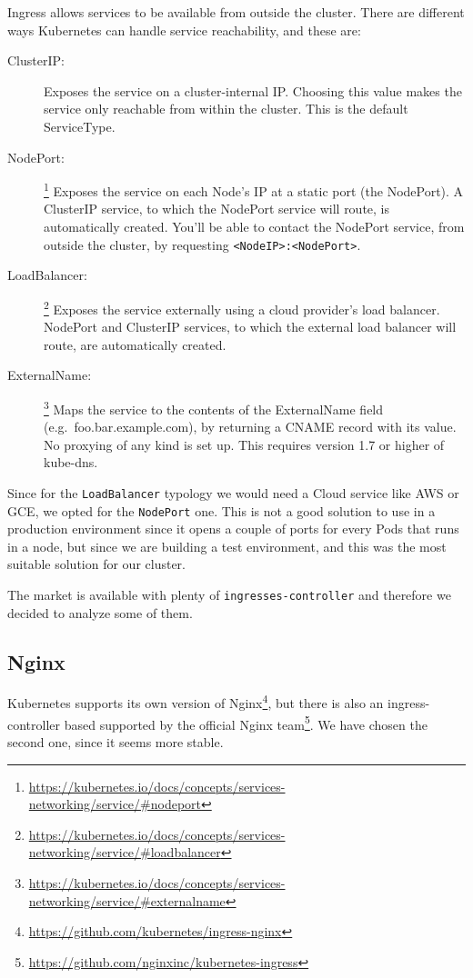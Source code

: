 Ingress allows services to be available from outside the cluster. There are 
different ways Kubernetes can handle service reachability, and these are:
\begin{description}
  \item [ClusterIP:] Exposes the service on a cluster-internal IP. Choosing this
  value makes the service only reachable from within the cluster. This
  is the default ServiceType.
  \item [NodePort:]
  \footnote{\url{https://kubernetes.io/docs/concepts/services-networking/service/\#nodeport}}
  Exposes the service on each Node's IP at a static port (the NodePort).
  A ClusterIP service, to which the NodePort service will route, is
  automatically created. You'll be able to contact the NodePort service,
  from outside the cluster, by requesting
  \texttt{\textless{}NodeIP\textgreater{}:\textless{}NodePort\textgreater{}}.
  \item [LoadBalancer:]
  \footnote{\url{https://kubernetes.io/docs/concepts/services-networking/service/\#loadbalancer}}
  Exposes the service externally using a cloud provider's load balancer.
  NodePort and ClusterIP services, to which the external load balancer
  will route, are automatically created.
  \item [ExternalName:]
  \footnote{\url{https://kubernetes.io/docs/concepts/services-networking/service/\#externalname}}
  Maps the service to the contents of the ExternalName field
  (e.g.~foo.bar.example.com), by returning a CNAME record with its
  value. No proxying of any kind is set up. This requires version 1.7 or
  higher of kube-dns.
\end{description}

Since for the \texttt{LoadBalancer} typology we would need a Cloud service like 
AWS or GCE, we opted for the \texttt{NodePort} one. This is not a good solution 
to use in a production environment since it opens a couple of ports for every 
Pods that runs in a node, but since we are building a test environment, and this
was the most suitable solution for our cluster.

The market is available with plenty of \texttt{ingresses-controller} and 
therefore we decided to analyze some of them.

\subsection{Nginx}
\label{nginx}
Kubernetes supports its own version of Nginx\footnote{
\url{https://github.com/kubernetes/ingress-nginx}}, but there is also an
ingress-controller based supported by the official Nginx team\footnote{
\url{https://github.com/nginxinc/kubernetes-ingress}}.
We have chosen the second one, since it seems more stable.

